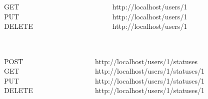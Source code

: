 
\begin{frame}
  \frametitle{\insertsection}
  \begin{columns}
    \begin{column}{.3\textwidth}
      \begin{flushright}
      GET\\
      PUT\\
      DELETE
      \end{flushright}
    \end{column}    
    \begin{column}{.7\textwidth}
      \begin{flushleft}
      http://localhost/users/1\\
      http://localhost/users/1\\
      http://localhost/users/1\\
      \end{flushleft}
    \end{column}    
    \end{columns}
\end{frame}


\begin{frame}
  \frametitle{\insertsection}
  \begin{columns}
    \begin{column}{.3\textwidth}
      \begin{flushright}
      POST\\
      GET\\
      PUT\\
      DELETE
      \end{flushright}
    \end{column}    
    \begin{column}{.7\textwidth}
      \begin{flushleft}
      http://localhost/users/1/statuses\\
      http://localhost/users/1/statuses/1\\
      http://localhost/users/1/statuses/1\\
      http://localhost/users/1/statuses/1\\
      \end{flushleft}
    \end{column}    
  \end{columns}
\end{frame}

